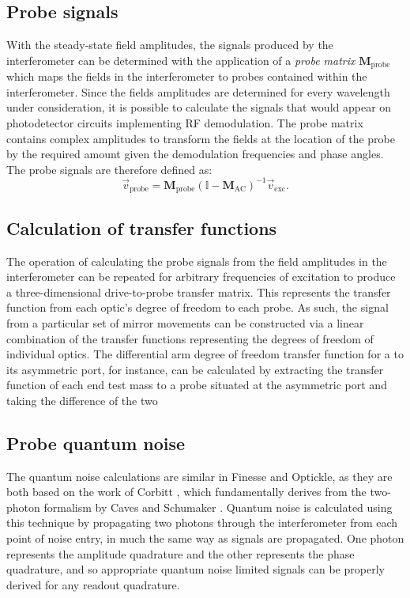 \subsection{Probe signals}
With the steady-state field amplitudes, the signals produced by the interferometer can be determined with the application of a \emph{probe matrix} $\mathbf{M}_{\text{probe}}$ which maps the fields in the interferometer to probes contained within the interferometer. Since the fields amplitudes are determined for every wavelength under consideration, it is possible to calculate the signals that would appear on photodetector circuits implementing \gls{RF} demodulation. The probe matrix contains complex amplitudes to transform the fields at the location of the probe by the required amount given the demodulation frequencies and phase angles. The probe signals are therefore defined as:
\begin{equation}
  \vec{v}_{\text{probe}} = \mathbf{M}_{\text{probe}} \left( \mathbb{I} - \mathbf{M}_{\text{AC}} \right)^{-1} \vec{v}_{\text{exc}}.
\end{equation}

\subsection{Calculation of transfer functions}
The operation of calculating the probe signals from the field amplitudes in the interferometer can be repeated for arbitrary frequencies of excitation to produce a three-dimensional drive-to-probe transfer matrix. This represents the transfer function from each optic's degree of freedom to each probe. As such, the signal from a particular set of mirror movements can be constructed via a linear combination of the transfer functions representing the degrees of freedom of individual optics. The differential arm degree of freedom transfer function for a \MI{} to its asymmetric port, for instance, can be calculated by extracting the transfer function of each end test mass to a probe situated at the asymmetric port and taking the difference of the two 

\subsection{Probe quantum noise}
The quantum noise calculations are similar in Finesse and Optickle, as they are both based on the work of Corbitt , which fundamentally derives from the two-photon formalism by Caves and Schumaker \cite{Caves1985, Schumaker1985}. Quantum noise is calculated using this technique by propagating two photons through the interferometer from each point of noise entry, in much the same way as signals are propagated. One photon represents the amplitude quadrature and the other represents the phase quadrature, and so appropriate quantum noise limited signals can be properly derived for any readout quadrature.

